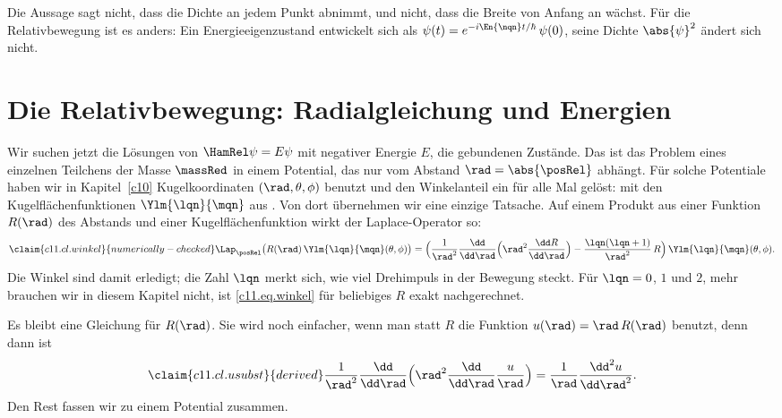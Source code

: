 \begin{vertiefung}
  Die Aussage sagt nicht, dass die Dichte an jedem Punkt abnimmt, und nicht, dass die
  Breite von Anfang an wächst. Für die Relativbewegung ist es anders: Ein
  Energieeigenzustand entwickelt sich als
  $\psi(t) = e^{-i\En{\nqn}t/\hbar}\,\psi(0)$, seine Dichte $\abs{\psi}^2$ ändert sich
  nicht.
\end{vertiefung}


\section{Die Relativbewegung: Radialgleichung und Energien}\label{c11.s4}

Wir suchen jetzt die Lösungen von
$\HamRel\psi = E\psi$ mit negativer Energie $E$, die gebundenen Zustände. Das ist das
Problem eines einzelnen Teilchens der Masse $\massRed$ in einem Potential, das nur vom
Abstand $\rad = \abs{\posRel}$ abhängt. Für solche Potentiale haben wir in
Kapitel~\ref{c10} Kugelkoordinaten $(\rad, \theta, \phi)$ benutzt und den Winkelanteil
ein für alle Mal gelöst: mit den Kugelflächenfunktionen $\Ylm{\lqn}{\mqn}$ aus
. Von dort übernehmen wir eine einzige Tatsache. Auf einem Produkt aus einer
Funktion $R(\rad)$ des Abstands und einer Kugelflächenfunktion wirkt der
Laplace-Operator so:
\begin{equation}\label{c11.eq.winkel}\claim{c11.cl.winkel}{numerically-checked}
  \Lap_{\posRel}\bigl(R(\rad)\,\Ylm{\lqn}{\mqn}(\theta, \phi)\bigr)
  = \Bigl(\frac{1}{\rad^2}\frac{\dd}{\dd\rad}\Bigl(\rad^2\frac{\dd R}{\dd\rad}\Bigr)
    - \frac{\lqn(\lqn + 1)}{\rad^2}\,R\Bigr)\,\Ylm{\lqn}{\mqn}(\theta, \phi).
\end{equation}
Die Winkel sind damit erledigt; die Zahl $\lqn$ merkt sich, wie viel Drehimpuls in der
Bewegung steckt. Für $\lqn = 0$, $1$ und $2$, mehr brauchen wir in diesem Kapitel nicht,
ist \eqref{c11.eq.winkel} für beliebiges $R$ exakt nachgerechnet.

Es bleibt eine Gleichung für $R(\rad)$. Sie wird noch einfacher, wenn man statt $R$ die
Funktion $u(\rad) = \rad\,R(\rad)$ benutzt, denn dann ist
\begin{equation}\label{c11.eq.usubst}\claim{c11.cl.usubst}{derived}
  \frac{1}{\rad^2}\frac{\dd}{\dd\rad}\Bigl(\rad^2\frac{\dd}{\dd\rad}\frac{u}{\rad}\Bigr)
  = \frac{1}{\rad}\frac{\dd^2 u}{\dd\rad^2} .
\end{equation}
Den Rest fassen wir zu einem Potential zusammen.


